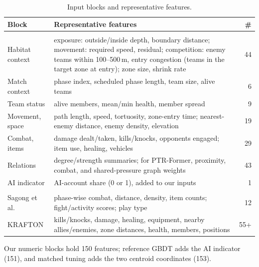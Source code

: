 \documentclass[sigconf,anonymous,nonacm]{acmart}
\begin{document}
\begin{table}[t]
\centering
\caption{Input blocks and representative features.}
\label{tab:blocks}
\footnotesize
\setlength{\tabcolsep}{3pt}
\begin{tabular}{>{\raggedright\arraybackslash}p{1.45cm}p{5.8cm}r}
\hline
Block & Representative features & \# \\
\hline
\multicolumn{3}{l}{\emph{Our inputs}} \\
Habitat context & exposure: outside/inside depth, boundary distance; movement: required speed, residual; competition: enemy teams within 100--500\,m, entry congestion (teams in the target zone at entry); zone size, shrink rate & 44 \\
Match context & phase index, scheduled phase length, team size, alive teams & 6 \\
Team status & alive members, mean/min health, member spread & 9 \\
Movement, space & path length, speed, tortuosity, zone-entry time; nearest-enemy distance, enemy density, elevation & 19 \\
Combat, items & damage dealt/taken, kills/knocks, opponents engaged; item use, healing, vehicles & 29 \\
Relations & degree/strength summaries; for PTR-Former, proximity, combat, and shared-pressure graph weights & 43 \\
AI indicator & AI-account share (0 or 1), added to our inputs & 1 \\
\hline
\multicolumn{3}{l}{\emph{Prior designs}} \\
Sagong et al. & phase-wise combat, distance, density, item counts; fight/activity scores; play type & 12 \\
KRAFTON & kills/knocks, damage, healing, equipment, nearby allies/enemies, zone distances, health, members, positions & 55+ \\
\hline
\end{tabular}
\smallskip
\parbox{\columnwidth}{\scriptsize Our numeric blocks hold 150 features; reference GBDT adds the AI indicator (151), and matched tuning adds the two centroid coordinates (153).}
\end{table}
\end{document}
